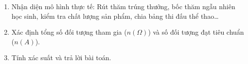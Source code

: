 \begin{enumerate}
\item Nhận diện mô hình thực tế: Rút thăm trúng thưởng, bốc thăm ngẫu nhiên học sinh, kiểm tra chất lượng sản phẩm, chia bảng thi đấu thể thao\dots
\item Xác định tổng số đối tượng tham gia ($n(\Omega)$) và số đối tượng đạt tiêu chuẩn ($n(A)$).
\item Tính xác suất và trả lời bài toán.
\end{enumerate}
